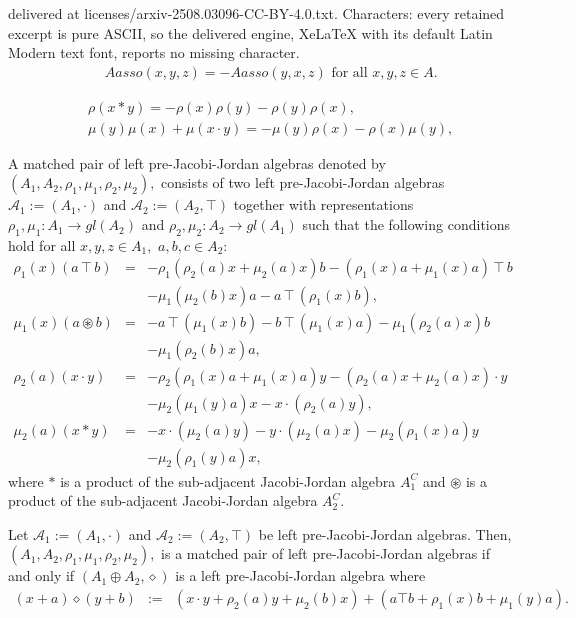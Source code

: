 \documentclass[10pt,a4paper]{amsart}
\begin{document}
delivered at licenses/arxiv-2508.03096-CC-BY-4.0.txt. Characters: every retained excerpt is pure ASCII, so the delivered engine, XeLaTeX with its default Latin Modern text font, reports no missing character.
		\begin{eqnarray}
			&& Aasso(x,y,z)=-Aasso(y,x,z) \mbox{ for all $x,y,z\in A.$} \label{HpJJi}
		\end{eqnarray}

		\begin{eqnarray}
			&&\rho(x\ast y)=-\rho(x)\rho(y)-\rho(y)\rho(x),
			\label{7}\\
			&&\mu(y)\mu(x)+\mu(x\cdot y)=-\mu(y)\rho(x)-\rho(x)\mu(y), \label{8}
		\end{eqnarray}

	\begin{definition}
		A matched pair of left pre-Jacobi-Jordan algebras denoted by $(A_1,A_2,\rho_1,
		\mu_1,\rho_2,\mu_2),$ consists of two left pre-Jacobi-Jordan algebras $\mathcal{A}_1:=(A_1,\cdot)$ and 
		$\mathcal{A}_2:=(A_2,\top)$ together with representations $\rho_1, \mu_1: A_1\rightarrow gl(A_2)$ and 
		$\rho_2, \mu_2: A_2\rightarrow gl(A_1)$  such that the following conditions hold for all $x,y,z\in A_1,$ $a,b,c\in A_2:$  
		\begin{eqnarray}
			\rho_1(x)(a\intercal b)&=&-\rho_1(\rho_2(a)x+\mu_2(a)x)b-(\rho_1(x)a+
			\mu_1(x)a)\intercal b\nonumber\\
			&&-\mu_1(\mu_2(b)x)a-a\intercal(\rho_1(x)b),\label{mppHJJ1}\\
			\mu_1(x)(a\circledast b)&=&-a\intercal(\mu_1(x)b)-b\intercal(\mu_1(x)a)
			-\mu_1(\rho_2(a)x)b\nonumber\\
			&&-\mu_1(\rho_2(b)x)a,\label{mppHJJ2}\\
			\rho_2(a)(x\cdot y)&=&-\rho_2(\rho_1(x)a+\mu_1(x)a)y-(\rho_2(a)x+
			\mu_2(a)x)\cdot y\nonumber\\
			&&-\mu_2(\mu_1(y)a)x-x\cdot(\rho_2(a)y),\label{mppHJJ3}\\
			\mu_2(a)(x\ast y)&=&-x\cdot(\mu_2(a)
			y)-y\cdot(\mu_2(a)x)
			-\mu_2(\rho_1(x)a)y\nonumber\\
			&&-\mu_2(\rho_1(y)a)x,\label{mppHJJ4}
		\end{eqnarray}
		where $\ast$ is a product of the sub-adjacent Jacobi-Jordan algebra $A_1^C$ and $\circledast$ is a product of the sub-adjacent Jacobi-Jordan algebra $A_2^C.$
	\end{definition}

	\begin{theorem}
		Let $\mathcal{A}_1:=(A_1,\cdot)$ and 
		$\mathcal{A}_2:=(A_2,\top)$ be left pre-Jacobi-Jordan algebras. Then,
		$(A_1,A_2,\rho_1,\mu_1,\rho_2,\mu_2),$ is a matched pair of left pre-Jacobi-Jordan algebras if and only if  $(A_1\oplus A_2, \diamond)$ is a left pre-Jacobi-Jordan algebra where
		\begin{eqnarray}
			(x+a)\diamond(y+b)&:=&(x\cdot y+\rho_2(a)y+\mu_2(b)x)+(a\top b+\rho_1(x)b+\mu_1(y)a). \label{oppHJJ1}
		\end{eqnarray}
	\end{theorem}
\end{document}

